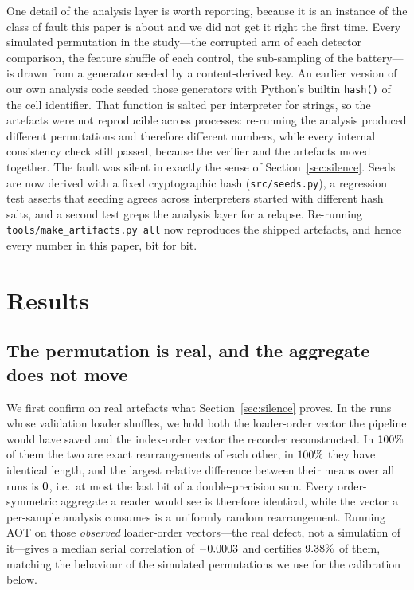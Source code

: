 \documentclass[a4paper,fleqn]{cas-sc}
\begin{document}
One detail of the analysis layer is worth reporting, because it is an instance of
the class of fault this paper is about and we did not get it right the first time.
Every simulated permutation in the study---the corrupted arm of each detector
comparison, the feature shuffle of each control, the sub-sampling of the
battery---is drawn from a generator seeded by a content-derived key. An earlier
version of our own analysis code seeded those generators with Python's builtin
\texttt{hash()} of the cell identifier. That function is salted per interpreter
for strings, so the artefacts were not reproducible across processes: re-running
the analysis produced different permutations and therefore different numbers,
while every internal consistency check still passed, because the verifier and the
artefacts moved together. The fault was silent in exactly the sense of
Section~\ref{sec:silence}. Seeds are now derived with a fixed cryptographic hash
(\texttt{src/seeds.py}), a regression test asserts that seeding agrees across
interpreters started with different hash salts, and a second test greps the
analysis layer for a relapse. Re-running \texttt{tools/make\_artifacts.py all}
now reproduces the shipped artefacts, and hence every number in this paper,
bit for bit.

\section{Results}
\label{sec:results}

\subsection{The permutation is real, and the aggregate does not move}
\label{sec:res-mask}

We first confirm on real artefacts what Section~\ref{sec:silence} proves. In the
\NumMaskChecked{} runs whose validation loader shuffles, we hold both the
loader-order vector the pipeline would have saved and the index-order vector the
recorder reconstructed. In $100\%$ of them the two are exact
rearrangements of each other, in $100\%$ they have identical length,
and the largest relative difference between their means over all
\NumMaskChecked{} runs is $0{}$, i.e.\ at most the last bit
of a double-precision sum. Every order-symmetric aggregate a reader would see is
therefore identical,
while the vector a per-sample analysis consumes is a uniformly random
rearrangement. Running AOT on those \NumObservedSeq{} \emph{observed}
loader-order vectors---the real defect, not a simulation of it---gives a median
serial correlation of $-0.0003{}$ and certifies
$9.38\%$ of them, matching the behaviour of the simulated
permutations we use for the calibration below.
\end{document}

